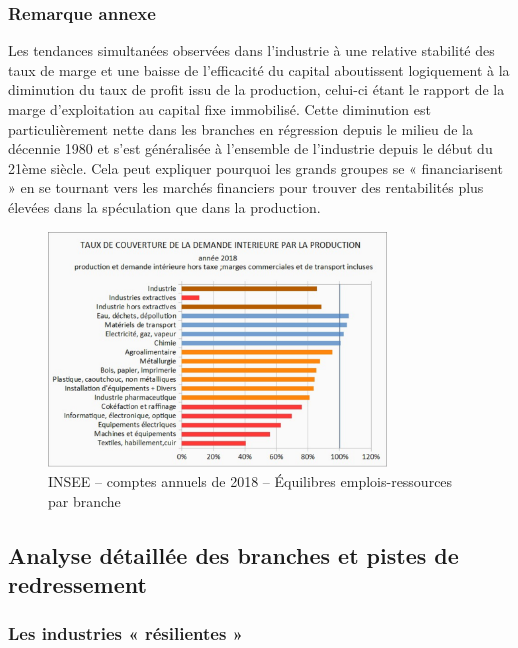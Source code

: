 \documentclass[a4paper]{article}
\begin{document}
\subsubsection{Remarque annexe}
Les tendances simultanées observées dans l’industrie à une relative stabilité des taux de marge et une baisse de l’efficacité du capital aboutissent logiquement à la diminution du taux de profit issu de la production, celui-ci étant le rapport de la marge d’exploitation au capital fixe immobilisé. Cette diminution est particulièrement nette dans les branches en régression depuis le milieu de la décennie 1980 et s’est généralisée à l’ensemble de l’industrie depuis le début du 21ème siècle. Cela peut expliquer pourquoi les grands groupes se « financiarisent » en se tournant vers les marchés financiers pour trouver des rentabilités plus élevées dans la spéculation que dans la production. 

\begin{figure}[H]
    \centering
    \includegraphics*[width=0.8\textwidth]{images/couverture}
    \caption{INSEE – comptes annuels de 2018 – Équilibres emplois-ressources par branche}
    \label{fig:couverture}
\end{figure}

\subsection{Analyse détaillée des branches et pistes de redressement}
\subsubsection{Les industries « résilientes »}
\end{document}
